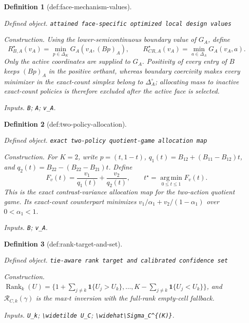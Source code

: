 \documentclass{article}
\newtheorem{definition}{Definition}
\begin{document}
\begin{definition}[def:face-mechanism-values]\label{def:face-mechanism-values}
\par\smallskip\noindent\emph{Defined object.} \texttt{attained face-\allowbreak{}specific optimized local design values}
\par\smallskip\noindent\emph{Construction.} Using the lower-semicontinuous boundary value of \(G_A\), define
\[
R_{B,A}^\star(v_A)=\min_{p\in\Delta_K}G_A(v_A,(Bp)_A),\qquad
R_{CR,A}^\star(v_A)=\min_{a\in\Delta_A}G_A(v_A,a).
\]
Only the active coordinates are supplied to \(G_A\).  Positivity of every entry of \(B\) keeps \((Bp)_A\) in the positive orthant, whereas boundary coercivity makes every minimizer in the exact-count simplex belong to \(\Delta_A^\circ\); allocating mass to inactive exact-count policies is therefore excluded after the active face is selected.
\par\smallskip\noindent\emph{Inputs.} \texttt{B}; \texttt{A}; \texttt{v\_\allowbreak{}A}.
\end{definition}

\begin{definition}[def:two-policy-allocation]\label{def:two-policy-allocation}
\par\smallskip\noindent\emph{Defined object.} \texttt{exact two-\allowbreak{}policy quotient-\allowbreak{}game allocation map}
\par\smallskip\noindent\emph{Construction.} For \(K=2\), write \(p=(t,1-t)\), \(q_1(t)=B_{12}+(B_{11}-B_{12})t\), and \(q_2(t)=B_{22}-(B_{22}-B_{21})t\).  Define
\[
F_v(t)=\frac{v_1}{q_1(t)}+\frac{v_2}{q_2(t)},\qquad
t^\star=\operatorname*{arg\,min}_{0\leq t\leq1}F_v(t).
\]
This is the exact contrast-variance allocation map for the two-action quotient game.  Its exact-count counterpart minimizes \(v_1/\alpha_1+v_2/(1-\alpha_1)\) over \(0<\alpha_1<1\).
\par\smallskip\noindent\emph{Inputs.} \texttt{B}; \texttt{v\_\allowbreak{}A}.
\end{definition}

\begin{definition}[def:rank-target-and-set]\label{def:rank-target-and-set}
\par\smallskip\noindent\emph{Defined object.} \texttt{tie-\allowbreak{}aware rank target and calibrated confidence set}
\par\smallskip\noindent\emph{Construction.} \(\operatorname{Rank}_k(U)=\{1+\sum_{j\neq k}\mathbf 1\{U_j>U_k\},\ldots,K-\sum_{j\neq k}\mathbf 1\{U_j<U_k\}\}\), and \(\mathcal R_{C,k}(\gamma)\) is the max-\(t\) inversion with the full-rank empty-cell fallback.
\par\smallskip\noindent\emph{Inputs.} \texttt{U\_\allowbreak{}k}; \texttt{\textbackslash{}\allowbreak{}widetilde U\_\allowbreak{}C}; \texttt{\textbackslash{}\allowbreak{}widehat\textbackslash{}\allowbreak{}Sigma\_\allowbreak{}C\textasciicircum{}\{(K)\}\allowbreak{}}.
\end{definition}
\end{document}
